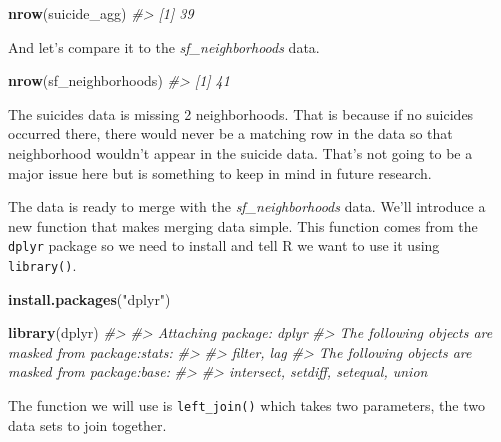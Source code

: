 \documentclass[
  12pt,
]{book}
\newenvironment{Shaded}{\begin{snugshade}}{\end{snugshade}}
\newcommand{\CommentTok}[1]{\textcolor[rgb]{0.37,0.37,0.37}{\textit{#1}}}
\newcommand{\KeywordTok}[1]{\textcolor[rgb]{0.27,0.27,0.27}{\textbf{#1}}}
\newcommand{\NormalTok}[1]{#1}
\newcommand{\StringTok}[1]{\textcolor[rgb]{0.5,0.5,0.5}{#1}}
\begin{document}
\begin{Shaded}
\begin{Highlighting}[]
\KeywordTok{nrow}\NormalTok{(suicide\_agg)}
\CommentTok{\#> [1] 39}
\end{Highlighting}
\end{Shaded}

And let's compare it to the \emph{sf\_neighborhoods} data.

\begin{Shaded}
\begin{Highlighting}[]
\KeywordTok{nrow}\NormalTok{(sf\_neighborhoods)}
\CommentTok{\#> [1] 41}
\end{Highlighting}
\end{Shaded}

The suicides data is missing 2 neighborhoods. That is because if no suicides occurred there, there would never be a matching row in the data so that neighborhood wouldn't appear in the suicide data. That's not going to be a major issue here but is something to keep in mind in future research.

The data is ready to merge with the \emph{sf\_neighborhoods} data. We'll introduce a new function that makes merging data simple. This function comes from the \texttt{dplyr} package so we need to install and tell R we want to use it using \texttt{library()}.

\begin{Shaded}
\begin{Highlighting}[]
\KeywordTok{install.packages}\NormalTok{(}\StringTok{"dplyr"}\NormalTok{)}
\end{Highlighting}
\end{Shaded}

\begin{Shaded}
\begin{Highlighting}[]
\KeywordTok{library}\NormalTok{(dplyr)}
\CommentTok{\#> }
\CommentTok{\#> Attaching package: \textquotesingle{}dplyr\textquotesingle{}}
\CommentTok{\#> The following objects are masked from \textquotesingle{}package:stats\textquotesingle{}:}
\CommentTok{\#> }
\CommentTok{\#>     filter, lag}
\CommentTok{\#> The following objects are masked from \textquotesingle{}package:base\textquotesingle{}:}
\CommentTok{\#> }
\CommentTok{\#>     intersect, setdiff, setequal, union}
\end{Highlighting}
\end{Shaded}

The function we will use is \texttt{left\_join()} which takes two parameters, the two data sets to join together.
\end{document}
